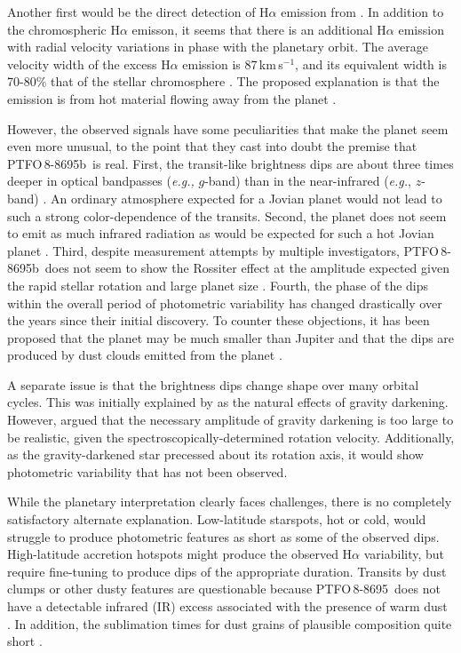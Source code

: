 \documentclass[12pt,twocolumn,tighten]{aastex62}
\newcommand{\ptfo}{PTFO$\,$8-8695}
\newcommand{\ptfob}{PTFO$\,$8-8695b}
\begin{document}
Another first would be the direct detection of H$\alpha$ emission from
\citep{johnskrull_h_2016}.  In addition to the chromospheric H$\alpha$
emisson, it seems that there is an additional H$\alpha$ emission with
radial velocity variations in phase with the planetary orbit.  The
average velocity width of the excess H$\alpha$ emission is
87$\,$km$\,$s$^{-1}$, and its equivalent width is 70-80\% that of the
stellar chromosphere \citep{johnskrull_h_2016}.  The proposed
explanation is that the emission is from hot material flowing away
from the planet \citep{johnskrull_h_2016}.

However, the observed signals have some peculiarities that make the
planet seem even more unusual, to the point that they cast into doubt
the premise that \ptfob\ is real.  First, the transit-like brightness
dips are about three times deeper in optical bandpasses ({\it e.g.,}
$g$-band) than in the near-infrared ({\it e.g.}, $z$-band)
\citep{onitsuka_multicolor_2017,tanimoto_evidence_2020}.  An ordinary
atmosphere expected for a Jovian planet would not lead to such a
strong color-dependence of the transits.  Second, the planet does not
seem to emit as much infrared radiation as would be expected for such
a hot Jovian planet \citep{yu_tests_2015}.  Third, despite measurement
attempts by multiple investigators, \ptfob\ does not seem to show the
Rossiter effect at the amplitude expected given the rapid stellar
rotation and large planet size
\citep{yu_tests_2015,ciardi_followup_2015}.  Fourth, the phase of the
dips within the overall period of photometric variability has changed
drastically over the years since their initial discovery.  To counter
these objections, it has been proposed that the planet may be much
smaller than Jupiter and that the dips are produced by dust clouds
emitted from the planet \citep{tanimoto_evidence_2020}. 

A separate issue is that the brightness dips change shape over many
orbital cycles. This was initially explained by
\cite{barnes_measurement_2013} as the natural effects of gravity
darkening.  However, \cite{howarth_reappraisal_2016} argued that the
necessary amplitude of gravity darkening is too large to be realistic,
given the spectroscopically-determined rotation velocity.
Additionally, as the gravity-darkened star precessed about its
rotation axis, it would show photometric variability that has not been
observed.

While the planetary interpretation clearly faces challenges, there is
no completely satisfactory alternate explanation.  Low-latitude
starspots, hot or cold, would struggle to produce photometric features
as short as some of the observed dips.  High-latitude accretion
hotspots might produce the observed H$\alpha$ variability, but require
fine-tuning to produce dips of the appropriate duration.  Transits by
dust clumps or other dusty features are questionable because \ptfo\
does not have a detectable infrared (IR) excess associated with the
presence of warm dust \citep[{\it e.g.},][Figure~18]{yu_tests_2015}.
In addition, the sublimation times for dust grains of plausible
composition  quite short
\citep{zhan_complex_2019}. 
\end{document}
